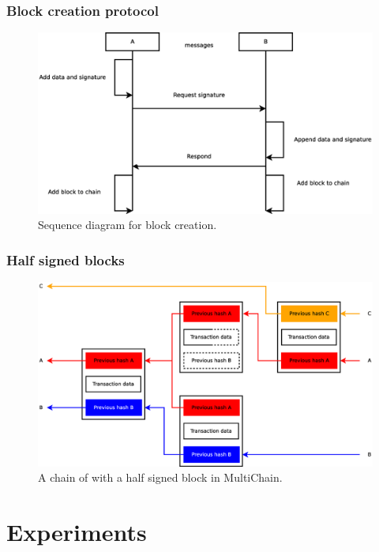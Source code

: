 \documentclass{beamer}
\begin{document}
\begin{frame}
\frametitle{Block creation protocol}
\begin{figure}
	\centerline{\includegraphics[scale=0.3]{images/design/exchange_new.eps}}
	\caption{Sequence diagram for block creation.}
	\label{fig:exchange-new-sequence}
\end{figure}

\end{frame}

\begin{frame}
\frametitle{Half signed blocks}
\begin{figure}
	\centerline{\includegraphics[scale=0.25]{images/design/halfsigned-chain.eps}}
	\caption{A chain of with a half signed block in MultiChain.}
	\label{fig:halfsigned-chain}
\end{figure}

\end{frame}

\section{Experiments}
\end{document}
